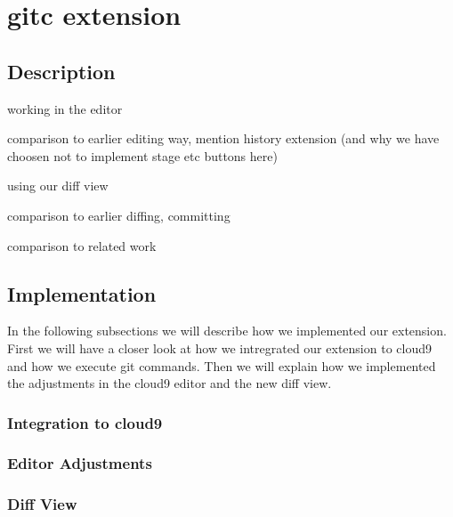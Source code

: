 \section{gitc extension}
\label{sec:Extension}

\subsection{Description}
working in the editor

comparison to earlier editing way, mention history extension (and why we have choosen not to implement stage etc buttons here)

using our diff view

comparison to earlier diffing, committing

comparison to related work

\subsection{Implementation}
In the following subsections we will describe how we implemented our extension.
First we will have a closer look at how we intregrated our extension to cloud9 and how we execute git commands.
Then we will explain how we implemented the adjustments in the cloud9 editor and the new diff view.

\subsubsection{Integration to cloud9}

\subsubsection{Editor Adjustments}

\subsubsection{Diff View}
